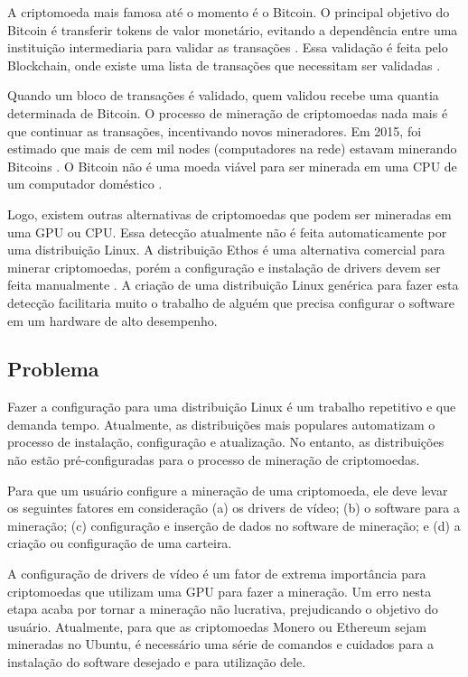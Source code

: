 \documentclass[
article,			%
12pt,				%
openright,			%
oneside,			%
a4paper,			%
chapter=TITLE,		%
section=TITLE,		%
subsection=TITLE,	%
subsubsection=TITLE,%
subsubsubsection=TITLE, %
english,			%
brazil,				%
]{abntex2}
\begin{document}
A criptomoeda mais famosa até o momento é o Bitcoin. O principal
objetivo do Bitcoin é transferir tokens de valor monetário, evitando a
dependência entre uma instituição intermediaria para validar as
transações \cite{Nakamoto2008}. Essa validação é feita pelo
Blockchain, onde existe uma lista de transações que necessitam ser
validadas \cite{Economist2015}.

Quando um bloco de transações é validado, quem validou recebe uma
quantia determinada de Bitcoin. O processo de mineração de
criptomoedas nada mais é que continuar as transações, incentivando
novos mineradores. Em 2015, foi estimado que mais de cem mil nodes
(computadores na rede) estavam minerando Bitcoins \cite{Coin2015}. O
Bitcoin não é uma moeda viável para ser minerada em uma CPU de um
computador doméstico \cite{Bitcoins2018}.

Logo, existem outras alternativas de criptomoedas que podem ser
mineradas em uma GPU ou CPU\@. Essa detecção atualmente não é feita
automaticamente por uma distribuição Linux. A distribuição Ethos é uma
alternativa comercial para minerar criptomoedas, porém a configuração
e instalação de drivers devem ser feita manualmente \cite{EthOS2018}.
A criação de uma distribuição Linux genérica para fazer esta detecção
facilitaria muito o trabalho de alguém que precisa configurar o
software em um hardware de alto desempenho.

\subsection{Problema}

Fazer a configuração para uma distribuição Linux é um trabalho
repetitivo e que demanda tempo. Atualmente, as distribuições mais
populares automatizam o processo de instalação, configuração e
atualização. No entanto, as distribuições não estão pré-configuradas
para o processo de mineração de criptomoedas.

Para que um usuário configure a mineração de uma criptomoeda, ele deve
levar os seguintes fatores em consideração (a) os drivers de vídeo;
(b) o software para a mineração; (c) configuração e inserção de dados
no software de mineração; e (d) a criação ou configuração de uma
carteira. 

A configuração de drivers de vídeo é um fator de extrema importância
para criptomoedas que utilizam uma GPU para fazer a mineração. Um erro
nesta etapa acaba por tornar a mineração não lucrativa, prejudicando o
objetivo do usuário. Atualmente, para que as criptomoedas Monero ou
Ethereum sejam mineradas no Ubuntu, é necessário uma série de comandos
e cuidados para a instalação do software desejado e para utilização
dele.
\end{document}

